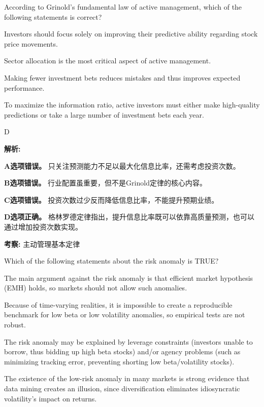 \documentclass{article}
\newcounter{question} %
\newenvironment{explanation}
{\textbf{解析:}\par}
{\par}
\newcommand{\checklist}[1]{
    \textbf{考察:} #1 \par %
    \addcontentsline{toc}{subsection}{题号\thequestion 考察: #1} %
    \vspace{2em} %
}
\begin{document}
\begin{question}
    According to Grinold's fundamental law of active management, which of the following statements is correct?
\end{question}

\begin{choices}
    \item Investors should focus solely on improving their predictive ability regarding stock price movements.
    \item Sector allocation is the most critical aspect of active management.
    \item Making fewer investment bets reduces mistakes and thus improves expected performance.
    \item To maximize the information ratio, active investors must either make high-quality predictions or take a large number of investment bets each year.
\end{choices}

\begin{correctanswer}
    D
\end{correctanswer}

\begin{explanation}
    \textbf{A选项错误。}  
    只关注预测能力不足以最大化信息比率，还需考虑投资次数。

    \textbf{B选项错误。}  
    行业配置虽重要，但不是Grinold定律的核心内容。

    \textbf{C选项错误。}  
    投资次数过少反而降低信息比率，不能提升预期业绩。

    \textbf{D选项正确。}  
    格林罗德定律指出，提升信息比率既可以依靠高质量预测，也可以通过增加投资次数实现。
\end{explanation}
\checklist{主动管理基本定律}


\begin{question}
    Which of the following statements about the risk anomaly is TRUE?
\end{question}

\begin{choices}
    \item The main argument against the risk anomaly is that efficient market hypothesis (EMH) holds, so markets should not allow such anomalies.
    \item Because of time-varying realities, it is impossible to create a reproducible benchmark for low beta or low volatility anomalies, so empirical tests are not robust.
    \item The risk anomaly may be explained by leverage constraints (investors unable to borrow, thus bidding up high beta stocks) and/or agency problems (such as minimizing tracking error, preventing shorting low beta/volatility stocks).
    \item The existence of the low-risk anomaly in many markets is strong evidence that data mining creates an illusion, since diversification eliminates idiosyncratic volatility's impact on returns.
\end{choices}
\end{document}
